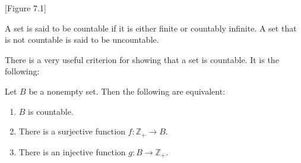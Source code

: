 [Figure 7.1]
\begin{definition}
 A set is said to be countable if it is either finite or countably infinite. A set that is not countable is said to be uncountable.
\end{definition}

There is a very useful criterion for showing that a set is countable. It is the following:

\begin{theorem}
\label{thm:\thetheorem}
 Let \(B\) be a nonempty set. Then the following are equivalent:

 \begin{enumerate}[itemsep=0.2em, parsep=0pt, topsep=0pt, partopsep=0pt, leftmargin=*, label=(\arabic*), align=left]
 \item \(B\) is countable.

 \item There is a surjective function \(f : \mathbb{Z}_{+} \rightarrow B\).

 \item There is an injective function \(g : B \rightarrow {\mathbb{Z}}_{+}\).
 \end{enumerate}
\end{theorem}

